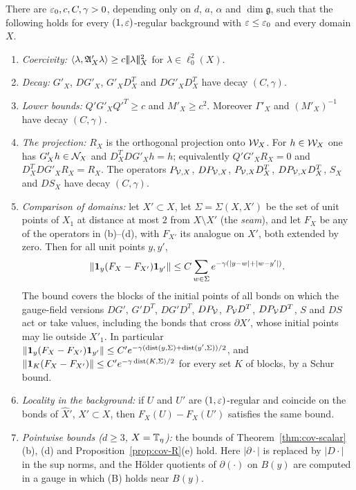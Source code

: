\begin{theorem}\label{thm:reg-scalar}
There are $\varepsilon_0,c,C,\gamma>0$, depending only on $d$, $a$, $\alpha$ and $\dim\mathfrak g$, such that the following holds for every $(1,\varepsilon)$-regular background with $\varepsilon\le\varepsilon_0$ and every domain $X$.
\begin{enumerate}[label=(\alph*)]
\item \emph{Coercivity:} $\langle \lambda,\mathfrak A'_X\lambda\rangle\ge c|\!|\!|\lambda|\!|\!|_X^2$ for $\lambda\in\ell^2_0(X)$.
\item \emph{Decay:} $G'_X$, $DG'_X$, $G'_XD^T_X$ and $DG'_XD^T_X$ have decay $(C,\gamma)$.
\item \emph{Lower bounds:} $Q'G'_XQ'^T\ge c$ and $M'_X\ge c^2$. Moreover $\Gamma'_X$ and $(M'_X)^{-1}$ have decay $(C,\gamma)$.
\item \emph{The projection:} $R_X$ is the orthogonal projection onto $\mathcal W_X$. For $h\in\mathcal W_X$ one has $G'_Xh\in\mathcal N_X$ and $D^T_XDG'_Xh=h$; equivalently $Q'G'_XR_X=0$ and $D^T_XDG'_XR_X=R_X$. The operators $P_{\mathcal V,X}$, $DP_{\mathcal V,X}$, $P_{\mathcal V,X}D^T_X$, $DP_{\mathcal V,X}D^T_X$, $S_X$ and $DS_X$ have decay $(C,\gamma)$.
\item \emph{Comparison of domains:} let $X'\subset X$, let $\Sigma=\Sigma(X,X')$ be the set of unit points of $X_1$ at distance at most $2$ from $X\setminus X'$ (the \emph{seam}), and let $F_X$ be any of the operators in (b)--(d), with $F_{X'}$ its analogue on $X'$, both extended by zero. Then for all unit points $y,y'$,
\[
\|\mathbf 1_y(F_X-F_{X'})\mathbf 1_{y'}\|\le C\sum_{w\in\Sigma}e^{-\gamma(|y-w|+|w-y'|)}.
\]
The bound covers the blocks of the initial points of all bonds on which the gauge-field versions $DG'$, $G'D^T$, $DG'D^T$, $DP_\mathcal V$, $P_\mathcal V D^T$, $DP_\mathcal V D^T$, $S$ and $DS$ act or take values, including the bonds that cross $\partial X'$, whose initial points may lie outside $X'_1$. In particular $\|\mathbf 1_y(F_X-F_{X'})\mathbf 1_{y'}\|\le C'e^{-\gamma(\operatorname{dist}(y,\Sigma)+\operatorname{dist}(y',\Sigma))/2}$, and $\|\mathbf 1_K(F_X-F_{X'})\|\le C'e^{-\gamma\operatorname{dist}(K,\Sigma)/2}$ for every set $K$ of blocks, by a Schur bound.
\item \emph{Locality in the background:} if $U$ and $U'$ are $(1,\varepsilon)$-regular and coincide on the bonds of $\hat X'$, $X'\subset X$, then $F_X(U)-F_X(U')$ satisfies the same bound.
\item \emph{Pointwise bounds ($d\ge3$, $X=\mathbb T_\eta$):} the bounds of Theorem~\ref{thm:cov-scalar}(b), (d) and Proposition~\ref{prop:cov-R}(e) hold. Here $|\partial\cdot|$ is replaced by $|D\cdot|$ in the sup norms, and the H\"older quotients of $\partial(\cdot)$ on $B(y)$ are computed in a gauge in which (B) holds near $B(y)$.
\end{enumerate}
\end{theorem}

